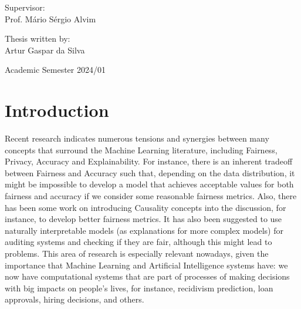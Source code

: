 \documentclass[conference]{IEEEtran}
\begin{document}
\begin{titlepage}
\begin{center}
        \vspace{0.5cm}


     \end{center}

\raggedright

\Large
    Supervisor:
    \vspace{0.2cm}\\
\Large
    Prof. Mário Sérgio Alvim
    \vspace{0.125cm}\\

\raggedleft

\Large
    Thesis written by:
    \vspace{0.125cm}\\
\Large
    Artur Gaspar da Silva



\begin{center}
    \vspace{1cm}
        Academic Semester 2024/01
\end{center}

\end{titlepage}


\newpage
\tableofcontents
\newpage
\twocolumn
\section{Introduction}

Recent research\cite{Sok}\cite{Reductions}\cite{Rachel}\cite{Awareness} indicates numerous tensions and synergies between many concepts that surround the Machine Learning literature, including Fairness, Privacy, Accuracy and Explainability. For instance, there is an inherent tradeoff between Fairness and Accuracy such that, depending on the data distribution, it might be impossible to develop a model that achieves acceptable values for both fairness and accuracy if we consider some reasonable fairness metrics\cite{Carlos}. Also, there has been some work on introducing Causality concepts into the discussion, for instance, to develop better fairness metrics\cite{CausalFair}. It has also been suggested to use naturally interpretable models (as explanations for more complex models) for auditing systems and checking if they are fair, although this might lead to problems\cite{ExplainAll}. This area of research is especially relevant nowadays, given the importance that Machine Learning and Artificial Intelligence systems have: we now have computational systems that are part of processes of making decisions with big impacts on people's lives, for instance, recidivism prediction\cite{Compass}, loan approvals\cite{Loans}, hiring decisions\cite{Jobs}, and others.
\end{document}
